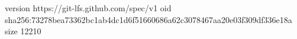 version https://git-lfs.github.com/spec/v1
oid sha256:73278bea73362bc1ab4dc1d6f51660686a62c3078467aa20e03f309df336e18a
size 12210
